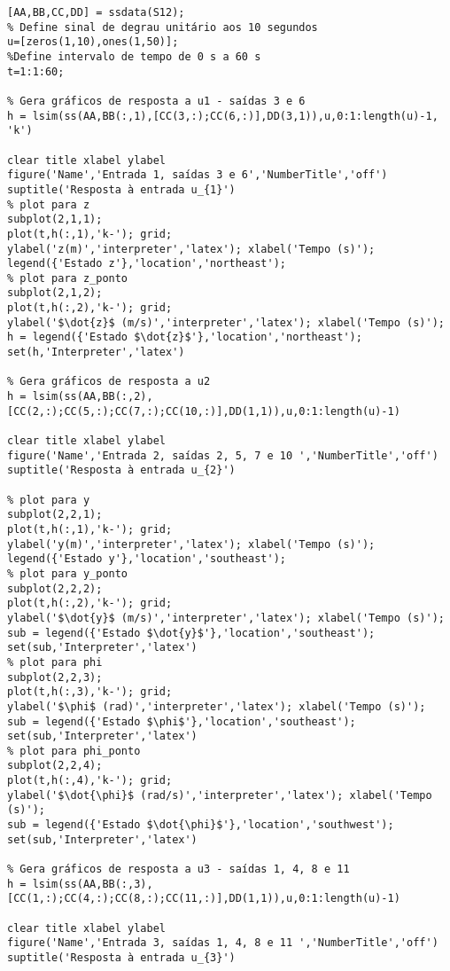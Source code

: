 \begin{lstlisting}[inputencoding=latin1]
% Define matrizes a serem usadas pelo lsim
[AA,BB,CC,DD] = ssdata(S12);
% Define sinal de degrau unitário aos 10 segundos
u=[zeros(1,10),ones(1,50)];
%Define intervalo de tempo de 0 s a 60 s
t=1:1:60;

% Gera gráficos de resposta a u1 - saídas 3 e 6
h = lsim(ss(AA,BB(:,1),[CC(3,:);CC(6,:)],DD(3,1)),u,0:1:length(u)-1, 'k')

clear title xlabel ylabel
figure('Name','Entrada 1, saídas 3 e 6','NumberTitle','off')
suptitle('Resposta à entrada u_{1}')
% plot para z
subplot(2,1,1);
plot(t,h(:,1),'k-'); grid;
ylabel('z(m)','interpreter','latex'); xlabel('Tempo (s)');
legend({'Estado z'},'location','northeast');
% plot para z_ponto
subplot(2,1,2);
plot(t,h(:,2),'k-'); grid;
ylabel('$\dot{z}$ (m/s)','interpreter','latex'); xlabel('Tempo (s)');
h = legend({'Estado $\dot{z}$'},'location','northeast');
set(h,'Interpreter','latex')

% Gera gráficos de resposta a u2
h = lsim(ss(AA,BB(:,2),[CC(2,:);CC(5,:);CC(7,:);CC(10,:)],DD(1,1)),u,0:1:length(u)-1)

clear title xlabel ylabel
figure('Name','Entrada 2, saídas 2, 5, 7 e 10 ','NumberTitle','off')
suptitle('Resposta à entrada u_{2}')

% plot para y
subplot(2,2,1);
plot(t,h(:,1),'k-'); grid;
ylabel('y(m)','interpreter','latex'); xlabel('Tempo (s)');
legend({'Estado y'},'location','southeast');
% plot para y_ponto
subplot(2,2,2);
plot(t,h(:,2),'k-'); grid;
ylabel('$\dot{y}$ (m/s)','interpreter','latex'); xlabel('Tempo (s)');
sub = legend({'Estado $\dot{y}$'},'location','southeast');
set(sub,'Interpreter','latex')
% plot para phi
subplot(2,2,3);
plot(t,h(:,3),'k-'); grid;
ylabel('$\phi$ (rad)','interpreter','latex'); xlabel('Tempo (s)');
sub = legend({'Estado $\phi$'},'location','southeast');
set(sub,'Interpreter','latex')
% plot para phi_ponto
subplot(2,2,4);
plot(t,h(:,4),'k-'); grid;
ylabel('$\dot{\phi}$ (rad/s)','interpreter','latex'); xlabel('Tempo (s)');
sub = legend({'Estado $\dot{\phi}$'},'location','southwest');
set(sub,'Interpreter','latex')

% Gera gráficos de resposta a u3 - saídas 1, 4, 8 e 11
h = lsim(ss(AA,BB(:,3),[CC(1,:);CC(4,:);CC(8,:);CC(11,:)],DD(1,1)),u,0:1:length(u)-1)

clear title xlabel ylabel
figure('Name','Entrada 3, saídas 1, 4, 8 e 11 ','NumberTitle','off')
suptitle('Resposta à entrada u_{3}')


\end{lstlisting}
